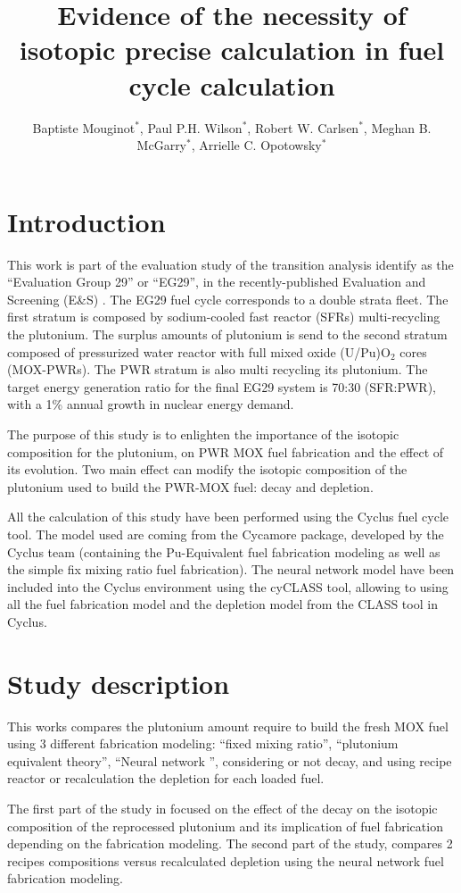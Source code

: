 \documentclass{anstrans}
\title{Evidence of the necessity of isotopic precise calculation in fuel cycle
calculation}
\author{Baptiste Mouginot$^{*}$, Paul P.H. Wilson$^{*}$, Robert W. Carlsen$^{*}$, Meghan B. McGarry$^{*}$,
Arrielle C. Opotowsky$^{*}$ }
\institute{
$^{*}$University of Wisconsin-Madison, WI
\and
}
\begin{document}
\section{Introduction} 

This work is part of the evaluation study of the transition analysis
\cite{Bo-fengpaper?} identify as the ``Evaluation Group 29'' or ``EG29'', in the
recently-published Evaluation and Screening (E\&S) \cite{ES}.  The EG29 fuel
cycle corresponds to a double strata fleet. The first stratum is composed by
sodium-cooled fast reactor (SFRs) multi-recycling the plutonium. The surplus
amounts of plutonium is send to the second stratum composed of pressurized water
reactor with full mixed oxide (U/Pu)O$_{2}$ cores (MOX-PWRs).  The PWR stratum
is also multi recycling its plutonium. The target energy generation ratio for
the final EG29 system is 70:30 (SFR:PWR), with a 1\% annual growth in nuclear
energy demand.

The purpose of this study is to enlighten the importance of the isotopic
composition for the plutonium, on PWR MOX fuel fabrication and the effect of its
evolution. Two main effect can modify the isotopic composition of the plutonium
used to build the PWR-MOX fuel: decay and depletion.

All the calculation of this study have been performed using the Cyclus fuel cycle
tool\cite{CYCLUS}. The model used are coming from the Cycamore package, developed by the
Cyclus team (containing the Pu-Equivalent fuel fabrication modeling as well as
the simple fix mixing ratio fuel fabrication). The neural network model have
been included into the Cyclus environment using the cyCLASS tool, allowing to
using all the fuel fabrication model and the depletion model from the CLASS tool
\cite{CLASS} in Cyclus.

\section{Study description}
This works compares the plutonium amount require to build the fresh MOX fuel
using 3 different fabrication modeling: ``fixed mixing ratio'', ``plutonium
equivalent theory'', ``Neural network \cite{CLASS_MLP}'', considering or not
decay, and using recipe reactor or recalculation the depletion for each loaded
fuel.

The first part of the study in focused on the effect of the decay on the
isotopic composition of the reprocessed plutonium and its implication of fuel
fabrication depending on the fabrication modeling.
The second part of the study, compares 2 recipes compositions versus recalculated
depletion using the neural network fuel fabrication modeling. 
\end{document}

